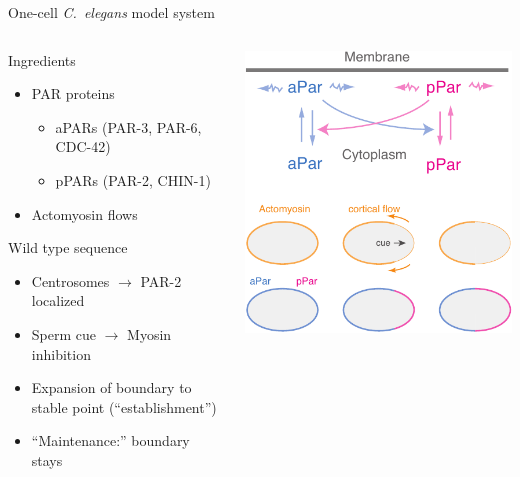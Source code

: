 \documentclass{beamer}
\newcommand{\6}[1]{#1_{\text{6}}}
\newcommand{\3}[1]{#1_{\text{3}}}
\begin{document}
\begin{frame}{One-cell \emph{C.\ elegans} model system}
\begin{columns}
\begin{column}{0.6\textwidth}
Ingredients
\begin{itemize}
\item PAR proteins 
\begin{itemize}
\item aPARs (PAR-3, PAR-6, CDC-42)
\item pPARs (PAR-2, CHIN-1)
\end{itemize}
\item Actomyosin flows 
\end{itemize}
Wild type sequence
\begin{itemize}
\item Centrosomes $\rightarrow$ PAR-2 localized
\item Sperm cue $\rightarrow$ Myosin inhibition
\item Expansion of boundary to stable point (``establishment'')
\item ``Maintenance:'' boundary stays
\end{itemize}
\end{column}

\begin{column}{0.5\textwidth}
\includegraphics[width=\textwidth]{CElegansScheme-crop.pdf}
\end{column}
\end{columns}
\end{frame}
\end{document}
